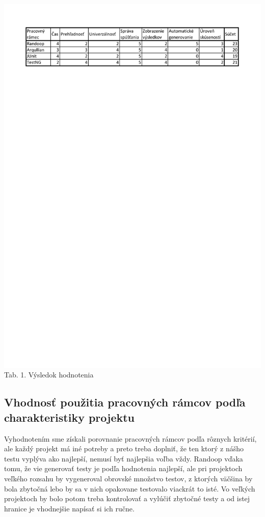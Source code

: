\documentclass[11pt,twoside,slovak,a4paper]{article}
\begin{document}
	\begin{center}
		\includegraphics[width = 400pt, trim = 0pt 700pt 0pt 0pt]{tabulka}
		\newline
		\tiny Tab. 1. Výsledok hodnotenia
	\end{center}
		
	\subsection{Vhodnosť použitia pracovných rámcov podľa charakteristiky projektu}
	Vyhodnotením sme získali porovnanie pracovných rámcov podľa rôznych kritérií, ale každý projekt má iné potreby a preto treba doplniť, že ten ktorý z nášho testu vyplýva ako najlepší, nemusí byť najlepšia voľba vždy. Randoop vďaka tomu, že vie generovať testy je podľa hodnotenia najlepší, ale pri projektoch veľkého rozsahu by vygeneroval obrovské množstvo testov, z ktorých väčšina by bola zbytočná lebo by sa v nich opakovane testovalo viackrát to isté. Vo veľkých projektoch by bolo potom treba kontrolovať a vylúčiť zbytočné testy a od istej hranice je vhodnejšie napísať si ich ručne.
	
\end{document}

